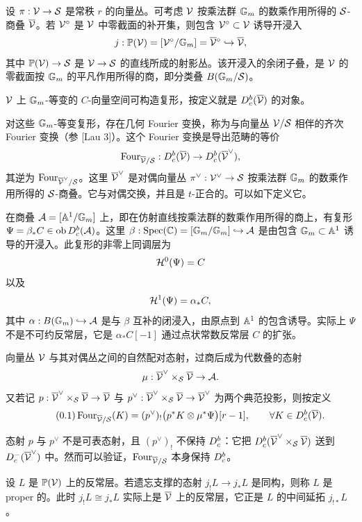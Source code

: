 设 $\pi:\mathcal{V}\to\mathcal{S}$ 是常秩 $r$ 的向量丛。可考虑 $\mathcal{V}$ 按乘法群 $\mathbb{G}_m$ 的数乘作用所得的 $\mathcal{S}$-商叠 $\overline{\mathcal{V}}$。若 $\mathcal{V}^\circ$ 是 $\mathcal{V}$ 中零截面的补开集，则包含 $\mathcal{V}^\circ\subset\mathcal{V}$ 诱导开浸入
\[ j:\mathbb{P}(\mathcal{V})=[\mathcal{V}^\circ/\mathbb{G}_m]=\overline{\mathcal{V}}{}^\circ\hookrightarrow\overline{\mathcal{V}}, \]
其中 $\mathbb{P}(\mathcal{V})\to\mathcal{S}$ 是 $\mathcal{V}\to\mathcal{S}$ 的直线所成的射影丛。该开浸入的余闭子叠，是 $\mathcal{V}$ 的零截面按 $\mathbb{G}_m$ 的平凡作用所得的商，即分类叠 $B(\mathbb{G}_m/\mathcal{S})$。

$\mathcal{V}$ 上 $\mathbb{G}_m$-等变的 $C$-向量空间可构造复形，按定义就是 $D^{b}_{c}(\overline{\mathcal{V}})$ 的对象。

对这些 $\mathbb{G}_m$-等变复形，存在几何 Fourier 变换，称为与向量丛 $\mathcal{V}/\mathcal{S}$ 相伴的齐次 Fourier 变换（参 [Lau 3]）。这个 Fourier 变换是导出范畴的等价
\[ \operatorname{Four}_{\overline{\mathcal{V}}/\mathcal{S}}:D^{b}_{c}(\overline{\mathcal{V}})\to D^{b}_{c}(\overline{\mathcal{V}}^\vee), \]
其逆为 $\operatorname{Four}_{\overline{\mathcal{V}}^\vee/\mathcal{S}}$。这里 $\overline{\mathcal{V}}^\vee$ 是对偶向量丛 $\pi^\vee:\mathcal{V}^\vee\to\mathcal{S}$ 按乘法群 $\mathbb{G}_m$ 的数乘作用所得的 $\mathcal{S}$-商叠。它与对偶交换，并且是 $t$-正合的。可以如下定义它。

在商叠 $\mathcal{A}=[\mathbb{A}^1/\mathbb{G}_m]$ 上，即在仿射直线按乘法群的数乘作用所得的商上，有复形 $\Psi=\beta_*C\in\operatorname{ob}D^{b}_{c}(\mathcal{A})$。这里 $\beta:\operatorname{Spec}(\mathbb{C})=[\mathbb{G}_m/\mathbb{G}_m]\hookrightarrow\mathcal{A}$ 是由包含 $\mathbb{G}_m\subset\mathbb{A}^1$ 诱导的开浸入。此复形的非零上同调层为
\[ \mathcal{H}^0(\Psi)=C \]
以及
\[ \mathcal{H}^1(\Psi)=\alpha_*C, \]
其中 $\alpha:B(\mathbb{G}_m)\hookrightarrow\mathcal{A}$ 是与 $\beta$ 互补的闭浸入，由原点到 $\mathbb{A}^1$ 的包含诱导。实际上 $\Psi$ 不是不可约反常层，它是 $\alpha_*C[-1]$ 通过点状常数反常层 $C$ 的扩张。

向量丛 $\mathcal{V}$ 与其对偶丛之间的自然配对态射，过商后成为代数叠的态射
\[ \mu:\overline{\mathcal{V}}^\vee\times_{\mathcal{S}}\overline{\mathcal{V}}\to\mathcal{A}. \]
%
又若记 $p:\overline{\mathcal{V}}^\vee\times_{\mathcal{S}}\overline{\mathcal{V}}\to\overline{\mathcal{V}}$ 与 $p^\vee:\overline{\mathcal{V}}^\vee\times_{\mathcal{S}}\overline{\mathcal{V}}\to\overline{\mathcal{V}}^\vee$ 为两个典范投影，则按定义
\[ \tag*{(0.1)} \operatorname{Four}_{\overline{\mathcal{V}}/\mathcal{S}}(K)=(p^\vee)_!\bigl(p^*K\otimes\mu^*\Psi\bigr)[r-1],\qquad \forall K\in D^{b}_{c}(\overline{\mathcal{V}}). \]

态射 $p$ 与 $p^\vee$ 不是可表态射，且 $(p^\vee)_!$ 不保持 $D^{b}_{c}$：它把 $D^{b}_{c}(\overline{\mathcal{V}}^\vee\times_{\mathcal{S}}\overline{\mathcal{V}})$ 送到 $D^-_c(\overline{\mathcal{V}}^\vee)$ 中。然而可以验证，$\operatorname{Four}_{\overline{\mathcal{V}}/\mathcal{S}}$ 本身保持 $D^{b}_{c}$。

\begin{definitionZ}[0.2]
设 $L$ 是 $\mathbb{P}(\mathcal{V})$ 上的反常层。若遗忘支撑的态射 $j_!L\to j_*L$ 是同构，则称 $L$ 是 proper 的。此时 $j_!L\cong j_*L$ 实际上是 $\overline{\mathcal{V}}$ 上的反常层，它正是 $L$ 的中间延拓 $j_{!*}L$。
\end{definitionZ}

